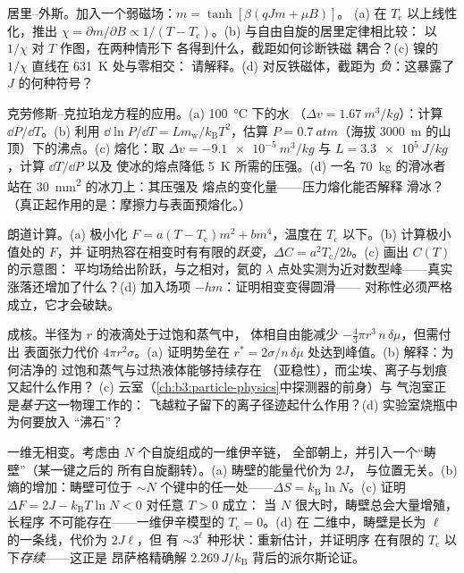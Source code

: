 \begin{exercise}[$\star\star$]\label{exo:b3:phase-transitions:6}
居里–外斯。加入一个弱磁场：$m = \tanh[\beta(qJm + \mu B)]$。
(a) 在 $T_{\text{c}}$ 以上线性化，推出 $\chi = \partial
m/\partial B \propto 1/(T - T_{\text{c}})$。(b) 与自由自旋的居里定律相比较：
以 $1/\chi$ 对 $T$ 作图，在两种情形下
各得到什么，截距如何诊断铁磁
耦合？(c) 镍的 $1/\chi$ 直线在 \qty{631}{K} 处与零相交：
请解释。(d) 对反铁磁体，截距为
\emph{负}：这暴露了 $J$ 的何种符号？
\end{exercise}

\begin{exercise}[$\star\star$]\label{exo:b3:phase-transitions:7}
克劳修斯–克拉珀龙方程的应用。(a) \qty{100}{\celsius} 下的水
（$\Delta v = \qty{1.67}{m^3/kg}$）：计算 $\dd P/\dd T$。(b)
利用 $\dd\ln P/\dd T = Lm_{\text{w}}/k_{\text{B}}T^2$，估算
$P = \qty{0.7}{atm}$（海拔 \qty{3000}{m}
的山顶）下的沸点。(c) 熔化：取 $\Delta v = \qty{-9.1e-5}{m^3/kg}$ 与
$L = \qty{3.3e5}{J/kg}$，计算 $\dd T/\dd P$ 以及
使冰的熔点降低 \qty{5}{K} 所需的压强。(d) 一名
\qty{70}{kg} 的滑冰者站在 \qty{30}{mm^2} 的冰刀上：其压强及
熔点的变化量——压力熔化能否解释
滑冰？（真正起作用的是：摩擦力与表面预熔化。）
\end{exercise}

\begin{exercise}[$\star\star$]\label{exo:b3:phase-transitions:8}
朗道计算。(a) 极小化 $F = a(T - T_{\text{c}})m^2 +
bm^4$，温度在 $T_{\text{c}}$ 以下。(b) 计算极小值处的 $F$，并
证明热容在相变时有有限的\emph{跃变}，$\Delta C =
a^2T_{\text{c}}/2b$。(c) 画出 $C(T)$ 的示意图：
平均场给出阶跃，与之相对，氦的
$\lambda$ 点处实测为近对数型峰——真实涨落还增加了什么？(d)
加入场项 $-hm$：证明相变变得圆滑——
对称性必须严格成立，它才会破缺。
\end{exercise}

\begin{exercise}[$\star\star$]\label{exo:b3:phase-transitions:9}
成核。半径为 $r$ 的液滴处于过饱和蒸气中，
体相自由能减少 $-\tfrac43\pi r^3\,n\,\delta\mu$，但需付出
表面张力代价 $4\pi r^2\sigma$。(a) 证明势垒在
$r^* = 2\sigma/n\,\delta\mu$ 处达到峰值。(b) 解释：为何洁净的
过饱和蒸气与过热液体能够持续存在
（亚稳性），而尘埃、离子与划痕又起什么作用？
(c) 云室（\cref{ch:b3:particle-physics}中探测器的前身）与
气泡室正是\emph{基于}这一物理工作的：
飞越粒子留下的离子径迹起什么作用？(d) 实验室烧瓶中为何要放入
“沸石”？
\end{exercise}

\begin{exercise}[$\star\star\star$]\label{exo:b3:phase-transitions:10}
一维无相变。考虑由 $N$ 个自旋组成的一维伊辛链，
全部朝上，并引入一个“畴壁”（某一键之后的
所有自旋翻转）。(a) 畴壁的能量代价为 $2J$，
与位置无关。(b) 熵的增加：畴壁可位于
$\sim N$ 个键中的任一处——$\Delta S = k_{\text{B}}\ln N$。(c)
证明 $\Delta F = 2J - k_{\text{B}}T\ln N < 0$ 对任意 $T > 0$ 成立：
当 $N$ 很大时，畴壁总会大量增殖，长程序
不可能存在——一维伊辛模型的 $T_{\text{c}} = 0$。(d) 在
二维中，畴壁是长为 $\ell$ 的一条线，代价为 $2J\ell$，但
有 $\sim3^\ell$ 种形状：重新估计，并证明序
在有限的 $T_{\text{c}}$ 以下\emph{存续}——这正是
昂萨格精确解 $2.269\,J/k_{\text{B}}$ 背后的派尔斯论证。
\end{exercise}


